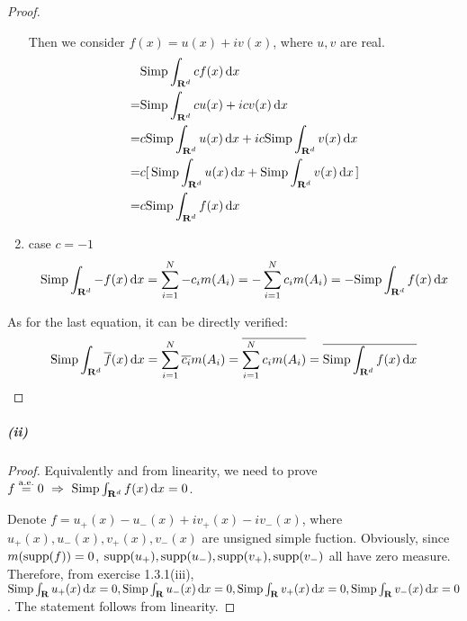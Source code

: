 \documentclass{article}
\begin{document}
\begin{proof}
\begin{enumerate}
Then we consider $f(x)=u(x)+iv(x)$, where $u,v$ are real.
\[\begin{aligned}
&\mathrm{Simp}\int_{\mathbf{R}^d}cf(x)\,\mathrm{d} x\\
=&\mathrm{Simp}\int_{\mathbf{R}^d}cu(x)+icv(x)\,\mathrm{d} x\\
=&c\mathrm{Simp}\int_{\mathbf{R}^d}u(x)\,\mathrm{d} x+ic\mathrm{Simp}\int_{\mathbf{R}^d}v(x)\,\mathrm{d} x\\
=&c[\,\mathrm{Simp}\int_{\mathbf{R}^d}u(x)\,\mathrm{d} x+\mathrm{Simp}\int_{\mathbf{R}^d}v(x)\,\mathrm{d} x\,]\\
=&c\mathrm{Simp}\int_{\mathbf{R}^d}f(x)\,\mathrm{d} x
\end{aligned}\]
\item{case $c=-1$}
\[%
\sip\int_{\mathbf{R}^d}-f(x)\dd x
=\sum_{i=1}^{N}-c_im(A_i)
=-\sum_{i=1}^{N}c_im(A_i)
=-\sip\int_{\mathbf{R}^d}f(x)\dd x
\]
\end{enumerate}

As for the last equation, it can be directly verified:
\[%
\sip\int_{\mathbf{R}^d}\overline{f}(x)\dd x
=\sum_{i=1}^{N}\overline{c_i}m(A_i)
=\overline{\sum_{i=1}^{N}c_im(A_i)}
=\overline{\sip\int_{\mathbf{R}^d}f(x)\dd x}
\]
\end{proof}

\subparagraph{(ii)}
\begin{proof}
Equivalently and from linearity, we need to prove $f\stackrel{\mathrm{a.e.}}{=}0\ \Rightarrow\ \mathrm{Simp}\int_{\mathbf{R}^d}f(x)\,\mathrm{d} x=0$.

Denote $f=u_+(x)-u_-(x)+iv_+(x)-iv_-(x)$, where $u_+(x),u_-(x),v_+(x),v_-(x)$ are unsigned simple fuction. Obviously, since $m(\mathrm{supp}(f))=0$, $\mathrm{supp}(u_+),\mathrm{supp}(u_-),\mathrm{supp}(v_+),\mathrm{supp}(v_-)$ all have zero measure. Therefore, from exercise 1.3.1(iii), $\mathrm{Simp}\int_{\mathbf{R}}u_+(x)\,\mathrm{d} x=0,\mathrm{Simp}\int_{\mathbf{R}}u_-(x)\,\mathrm{d} x=0,\mathrm{Simp}\int_{\mathbf{R}}v_+(x)\,\mathrm{d} x=0,\mathrm{Simp}\int_{\mathbf{R}}v_-(x)\,\mathrm{d} x=0$. The statement follows from linearity.
\end{proof}
\end{document}
